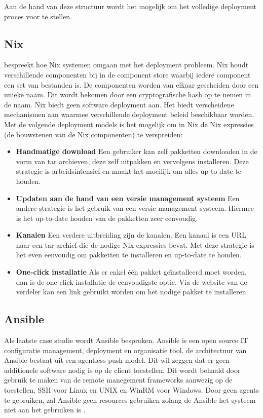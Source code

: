 Aan de hand van deze structuur wordt het mogelijk om het volledige deployment proces voor te stellen.

\subsection{Nix}
\citet{dolstra2006purely} bespreekt hoe Nix systemen omgaan met het deployment probleem.
Nix houdt verschillende componenten bij in de component store waarbij iedere component een set van bestanden is.
De componenten worden van elkaar gescheiden door een unieke naam.
Dit wordt bekomen door een cryptografische hash op te nemen in de naam.
Nix biedt geen software deployment aan.
Het biedt verscheidene mechanismen aan waarmee verschillende deployment beleid beschikbaar worden.
Met de volgende deployment models is het mogelijk om in Nix de Nix expressies (de bouwstenen van de Nix componenten) te verspreiden:
\begin{itemize}
\item \textbf{Handmatige download} Een gebruiker kan zelf pakketten downloaden in de vorm van tar archieven, deze zelf uitpakken en vervolgens installeren.
Deze strategie is arbeidsintensief en maakt het moeilijk om alles up-to-date te houden. 
\item \textbf{Updaten aan de hand van een versie management systeem} Een andere strategie is het gebruik van een versie management systeem.
Hiermee is het up-to-date houden van de pakketten zeer eenvoudig.
\item \textbf{Kanalen} Een verdere uitbreiding zijn de kanalen.
Een kanaal is een URL naar een tar archief die de nodige Nix expressies bevat.
Met deze strategie is het even eenvoudig om pakketten te installeren en up-to-date te houden.
\item \textbf{One-click installatie} Als er enkel één pakket geïnstalleerd moet worden, dan is de one-click installatie de eenvoudigste optie.
Via de website van de verdeler kan een link gebruikt worden om het nodige pakket te installeren.
\end{itemize}

\subsection{Ansible}
Als laatste case studie wordt Ansible besproken.
Ansible is een open source IT configuratie management, deployment en organisatie tool.
de architectuur van Ansible bestaat uit een agentless push model.
Dit wil zeggen dat er geen additionele software nodig is op de client toestellen.
Dit wordt behaald door gebruik te maken van de remote manegement frameworks aanwezig op de toestellen, SSH voor Linux en UNIX en WinRM voor Windows.
Door geen agents te gebruiken, zal Ansible geen resources gebruiken zolang de Ansible het systeem niet aan het gebruiken is \citep{ansible}.

